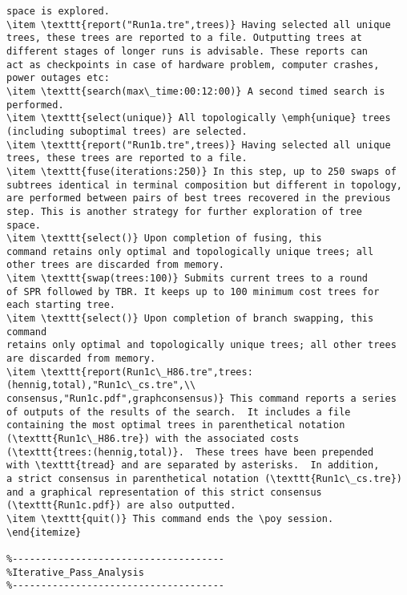 \begin{verbatim}
space is explored.  
\item \texttt{report("Run1a.tre",trees)} Having selected all unique 
trees, these trees are reported to a file. Outputting trees at 
different stages of longer runs is advisable. These reports can 
act as checkpoints in case of hardware problem, computer crashes, 
power outages etc: 
\item \texttt{search(max\_time:00:12:00)} A second timed search is
performed.  
\item \texttt{select(unique)} All topologically \emph{unique} trees 
(including suboptimal trees) are selected.
\item \texttt{report("Run1b.tre",trees)} Having selected all unique
trees, these trees are reported to a file.  
\item \texttt{fuse(iterations:250)} In this step, up to 250 swaps of
subtrees identical in terminal composition but different in topology,
are performed between pairs of best trees recovered in the previous
step. This is another strategy for further exploration of tree
space.  
\item \texttt{select()} Upon completion of fusing, this
command retains only optimal and topologically unique trees; all
other trees are discarded from memory.  
\item \texttt{swap(trees:100)} Submits current trees to a round 
of SPR followed by TBR. It keeps up to 100 minimum cost trees for 
each starting tree.  
\item \texttt{select()} Upon completion of branch swapping, this command
retains only optimal and topologically unique trees; all other trees
are discarded from memory.  
\item \texttt{report(Run1c\_H86.tre",trees:(hennig,total),"Run1c\_cs.tre",\\
consensus,"Run1c.pdf",graphconsensus)} This command reports a series
of outputs of the results of the search.  It includes a file
containing the most optimal trees in parenthetical notation
(\texttt{Run1c\_H86.tre}) with the associated costs
(\texttt{trees:(hennig,total)}.  These trees have been prepended
with \texttt{tread} and are separated by asterisks.  In addition,
a strict consensus in parenthetical notation (\texttt{Run1c\_cs.tre})
and a graphical representation of this strict consensus
(\texttt{Run1c.pdf}) are also outputted.  
\item \texttt{quit()} This command ends the \poy session.
\end{itemize}

%-------------------------------------
%Iterative_Pass_Analysis
%-------------------------------------


\end{verbatim}
